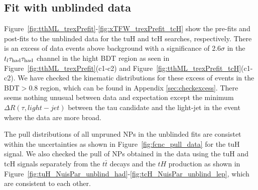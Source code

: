 








\subsection{Fit with unblinded data}
\label{sec:fit_data}

Figure~\ref{fig:tthML_trexPrefit}-\ref{fig:xTFW_trexPrefit_tcH} show the pre-fits and post-fits to the unblinded data for the tuH and tcH searches, respectively.
There is an excess of data events above background with a significance of 2.6$\sigma$ in the $t_l\tau_\text{had}{}\tau_\text{had}$ channel in the hight BDT region as seen in Figure~\ref{fig:tthML_trexPrefit}(c1-c2) and Figure~\ref{fig:tthML_trexPrefit_tcH}(c1-c2). We have checked the kinematic distributions for these excess of events in
the BDT$>0.8$ region, which can be found in Appendix \ref{sec:checkexcess}.  There seems nothing unusual between data and expectation except the minimum $\Delta R(\tau, light-jet)$ between the
tau candidate and the light-jet in the event where the data are more broad. 

The pull distributions of all unpruned NPs in the unblinded fits are consistet within the uncertainties as shown in Figure~\ref{fig:fcnc_pull_data}
for the tuH signal.
We also checked the pull of NPs obtained in the data using the tuH and tcH signals separately from the $t\bar t$ decays and the $tH$ production as shown
in Figure~\ref{fig:tuH_NuisPar_unblind_had}-\ref{fig:tcH_NuisPar_unblind_lep}, which are consistent to each other.

